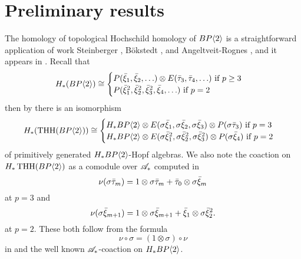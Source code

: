 
\section{Preliminary results}

The homology of topological Hochschild homology of $BP\langle 2 \rangle$ is a straightforward application of work Steinberger \cite{BMMS86}, B\"okstedt \cite{Bok85}, and Angeltveit-Rognes \cite{AngeltveitRognes}, and it appears in  \cite[Thm. 5.12]{AngeltveitRognes}. Recall that 
\[H_*(BP\langle 2 \rangle)\cong \begin{cases} P(\bar{\xi}_1,\bar{\xi}_2,\ldots )\otimes E(\bar{\tau}_{3},\bar{\tau}_4,\ldots) \text{ if } p \ge 3 \\ P(\bar{\xi}_1^2,\bar{\xi}_2^2,\bar{\xi}_3^2,\bar{\xi}_4,\ldots) \text{ if } p=2 \end{cases}\]
then by \cite[Thm. 5.12]{AngeltveitRognes} there is an isomorphism
\begin{equation}\label{HTHHB} H_*(\operatorname{THH}(BP\langle 2 \rangle))\cong \begin{cases} H_*BP\langle 2 \rangle \otimes E(\sigma{\bar{\xi}_1},\sigma{\bar{\xi}_2},\sigma{\bar{\xi}_3})\otimes P(\sigma{\bar{\tau}_3})\text{ if } p = 3 \\ H_*BP\langle 2 \rangle\otimes E(\sigma{\bar{\xi}^2_1},\sigma{\bar{\xi}^2_2},\sigma{\bar{\xi}^2_3})\otimes P(\sigma{\bar{\xi}_4}) \text{ if }p=2\end{cases}\end{equation}
of primitively generated $H_*BP\langle 2 \rangle$-Hopf algebras. We also note the coaction on $H_*\operatorname{THH}(BP\langle 2 \rangle)$ as a comodule over $\mathscr{A}_*$ computed in \cite[Thm. 5.12]{AngeltveitRognes}
\begin{equation}\label{coactp>2}\nu ( \sigma{\bar{\tau}_m}) = 1\otimes \sigma \bar{\tau}_m + \bar{\tau}_0\otimes\sigma{\bar{\xi}_m}\end{equation}
at $p = 3$ and 
\begin{equation}\label{coactp=2} \nu(\sigma{\bar{\xi}_{m+1}})=1\otimes\sigma{\bar{\xi}_{m+1}}+\bar{\xi}_1\otimes\sigma\bar{\xi}_2^2.\end{equation}
at $p=2$. These both follow from the formula
\begin{equation}\label{coactsigma} \nu \circ \sigma = (1\otimes \sigma)\circ \nu \end{equation}
in \cite[Eq. 5.11]{AngeltveitRognes} and the well known $\mathscr{A}_*$-coaction on $H_*BP\langle 2 \rangle$. 

